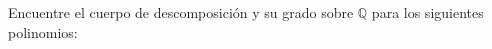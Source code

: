 Encuentre el cuerpo de descomposición y su grado sobre $\mathbb{Q}$ para los siguientes polinomios:

